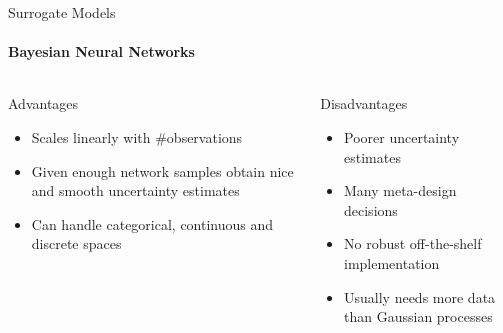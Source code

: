 \begin{frame}[c]{Surrogate Models}
\framesubtitle{Bayesian Neural Networks}

\begin{columns}[T] %
\begin{column}{.48\textwidth}

    \begin{block}{Advantages}
    \begin{itemize}
        \item Scales linearly with \#observations 
        \item Given enough network samples obtain nice and smooth uncertainty estimates 
        \item Can handle categorical, continuous and discrete spaces
    \end{itemize}
    \end{block}
\end{column}%

\hfill%
\pause

\begin{column}{.48\textwidth}
    \begin{block}{Disadvantages}
    \begin{itemize}
        \item Poorer uncertainty estimates 
        \item Many meta-design decisions 
    	\item No robust off-the-shelf implementation 
    	\item Usually needs more data than Gaussian processes
    \end{itemize}
    \end{block}

\end{column}
\end{columns}

\end{frame}
